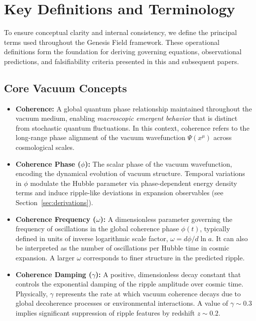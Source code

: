 \section{Key Definitions and Terminology}
\label{app:glossary}

To ensure conceptual clarity and internal consistency, we define the principal terms used throughout the Genesis Field framework. These operational definitions form the foundation for deriving governing equations, observational predictions, and falsifiability criteria presented in this and subsequent papers.

\subsection{Core Vacuum Concepts}

\begin{itemize}[leftmargin=*]
    \item \textbf{Coherence:} A global quantum phase relationship maintained throughout the vacuum medium, enabling \textit{macroscopic emergent behavior} that is distinct from stochastic quantum fluctuations. In this context, coherence refers to the long-range phase alignment of the vacuum wavefunction \( \Psi(x^\mu) \) across cosmological scales.

    \item \textbf{Coherence Phase (\( \phi \)):} The scalar phase of the vacuum wavefunction, encoding the dynamical evolution of vacuum structure. Temporal variations in \( \phi \) modulate the Hubble parameter via phase-dependent energy density terms and induce ripple-like deviations in expansion observables (see Section~\ref{sec:derivations}).

    \item \textbf{Coherence Frequency (\( \omega \)):} A dimensionless parameter governing the frequency of oscillations in the global coherence phase \( \phi(t) \), typically defined in units of inverse logarithmic scale factor, \( \omega = d\phi/d\ln a \). It can also be interpreted as the number of oscillations per Hubble time in cosmic expansion. A larger \( \omega \) corresponds to finer structure in the predicted ripple.

    \item \textbf{Coherence Damping (\( \gamma \)):} A positive, dimensionless decay constant that controls the exponential damping of the ripple amplitude over cosmic time. Physically, \( \gamma \) represents the rate at which vacuum coherence decays due to global decoherence processes or environmental interactions. A value of \( \gamma \sim 0.3 \) implies significant suppression of ripple features by redshift \( z \sim 0.2 \).


\end{itemize}
